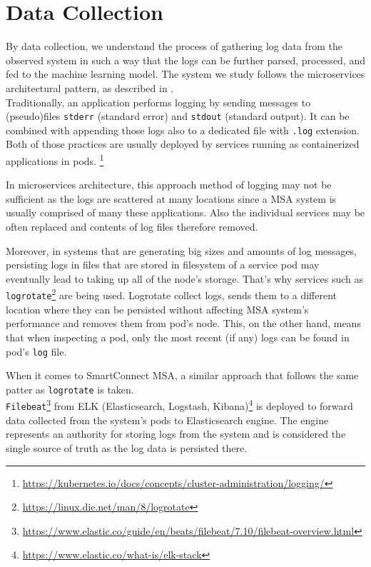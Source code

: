\section{Data Collection}
\label{data_collection}
By data collection, we understand the process of gathering log data from the observed system in such a way that the logs can be further parsed, processed, and fed to the machine learning model.
The system we study follows the microservices architectural pattern, as described in .\\

Traditionally, an application performs logging by sending messages to\\
(pseudo)files \texttt{stderr} (standard error) and \texttt{stdout} (standard output). It can be combined with appending those logs also to a dedicated file with \texttt{.log} extension. Both of those practices are usually deployed by services running as containerized applications in pods. \footnote{\url{https://kubernetes.io/docs/concepts/cluster-administration/logging/}}

In microservices architecture, this approach method of logging may not be sufficient as the logs are scattered at many locations since a MSA system is usually comprised of many these applications. Also the individual services may be often replaced and contents of log files therefore removed.

Moreover, in systems that are generating big sizes and amounts of log messages, persisting logs in files that are stored in filesystem of a service pod may eventually lead to taking up all of the node's storage. 
That's why services such as \texttt{logrotate}\footnote{\url{https://linux.die.net/man/8/logrotate}} are being used. Logrotate collect logs, sends them to a different location where they can be persisted without affecting MSA system's performance and removes them from pod's node. 
This, on the other hand, means that when inspecting a pod, only the most recent (if any) logs can be found in pod's \texttt{log} file.

When it comes to SmartConnect MSA, a similar approach that follows the same patter as \texttt{logrotate} is taken.\\ \texttt{Filebeat}\footnote{\url{https://www.elastic.co/guide/en/beats/filebeat/7.10/filebeat-overview.html}} from ELK (Elasticsearch, Logstash, Kibana)\footnote{\url{https://www.elastic.co/what-is/elk-stack}} is deployed to forward data collected from the system's pods to Elasticsearch engine. The engine represents an authority for storing logs from the system and is considered the single source of truth as the log data is persisted there. 


